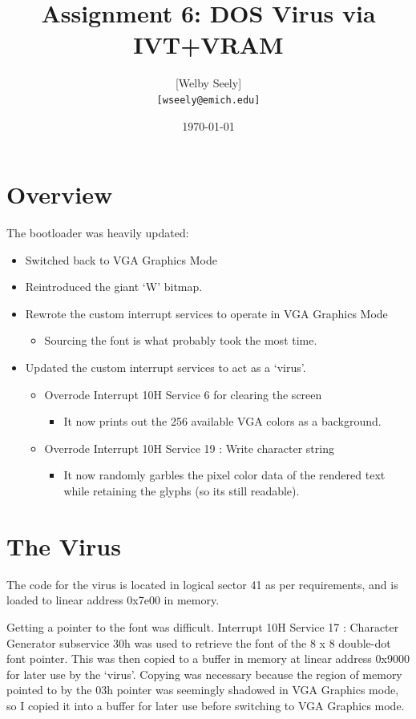\documentclass{article}
\title{Assignment 6: DOS Virus via IVT+VRAM}
\author{
    [Welby Seely] \\
    \texttt{[wseely@emich.edu]}
}
\date{\today}
\begin{document}
    \maketitle
    \section{Overview}\label{sec:intro}
    The bootloader was heavily updated:

    \begin{itemize}
        \item Switched back to VGA Graphics Mode
        \item Reintroduced the giant `W' bitmap.
        \item Rewrote the custom interrupt services to operate in VGA Graphics Mode
        \begin{itemize}
            \item Sourcing the font is what probably took the most time.
        \end{itemize}
        \item Updated the custom interrupt services to act as a `virus'.
        \begin{itemize}
            \item Overrode Interrupt 10H Service 6 for clearing the screen
            \begin{itemize}
                \item It now prints out the 256 available VGA colors as a background.
            \end{itemize}
            \item Overrode Interrupt 10H Service 19 : Write character string
            \begin{itemize}
                \item It now randomly garbles the pixel color data of the rendered text while retaining the glyphs (so it\textsc{}s still readable).
            \end{itemize}
        \end{itemize}
    \end{itemize}

    \section{The Virus}\label{sec:virus}
    The code for the virus is located in logical sector 41 as per requirements, and is loaded to linear address 0x7e00 in memory.

    Getting a pointer to the font was difficult.
    Interrupt 10H Service 17 : Character Generator subservice 30h was used to retrieve the font of the 8 x 8 double-dot font pointer.
    This was then copied to a buffer in memory at linear address 0x9000 for later use by the `virus'.
    Copying was necessary because the region of memory pointed to by the 03h pointer was seemingly shadowed in VGA Graphics mode, so I copied it into a buffer for later use before switching to VGA Graphics mode.
\end{document}
